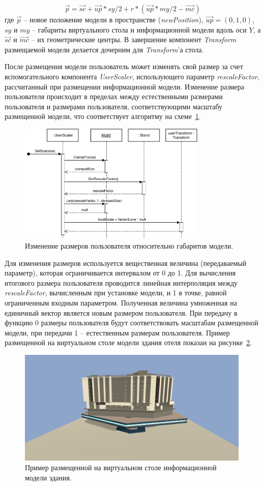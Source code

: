 \[
    \vec{p} = \vec{sc} +
    \vec{up} * sy / 2 +
    r * (
        \vec{up} * my / 2 - \vec{mc}
    )
\]
где $\vec{p}$ -- новое положение модели в пространстве (\emph{newPosition}),
$\vec{up} = (0,1,0)$,
$sy$ и $my$ -- габариты виртуального стола и информационной модели
вдоль оси $Y$, а $\vec{sc}$ и $\vec{mc}$ -- их геометрические центры.
В завершение компонент \emph{Transform} размещаемой модели
делается дочерним для \emph{Transform}'а стола.

После размещения модели пользователь может изменять свой размер
за счет вспомогательного компонента \emph{UserScaler},
использующего параметр \emph{rescaleFactor}, рассчитанный
при размещении информационной модели. Изменение размера пользователя
происходит в пределах между естественными размерами пользователя
и размерами пользователя, соответствующими масштабу размещенной модели,
что соответствует алгоритму на схеме~\ref{figure:SSetUserSize}.

\begin{figure}[!htp]
    \centering
    \includegraphics[width=0.8\textwidth]{images/UML-SSetUserSize.pdf}
    \caption{Изменение размеров пользователя
    относительно габаритов модели.}
    \label{figure:SSetUserSize}
\end{figure}

Для изменения размеров используется вещественная величина
(передаваемый параметр), которая ограничивается интервалом от 0 до 1.
Для вычисления итогового размера пользователя
проводится линейная интерполяция между \emph{rescaleFactor},
вычисленным при установке модели, и 1 в точке, равной
ограниченным входным параметром.
Полученная величина умноженная на единичный вектор
является новым размером пользователя.
При передачу в функцию 0 размеры пользователя будут
соответствовать масштабам размещенной модели,
при передачи 1 -- естественным размерам пользователя.
Пример размещенной на виртуальном столе модели здания отеля
показан на рисунке~\ref{figure:PlacedModelExample}.

\begin{figure}[!htp]
    \centering
    \includegraphics[width=0.99\textwidth, frame]{images/PlacedModelExample.png}
    \caption{Пример размещенной на виртуальном столе
    информационной модели здания.}
    \label{figure:PlacedModelExample}
\end{figure}
